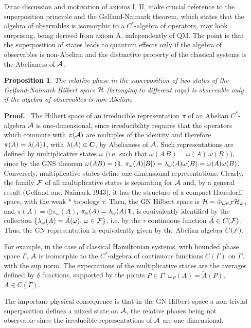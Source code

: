 \documentclass[12pt]{article}
\newtheorem{Proposition}[Theorem]{Proposition}
\def \Pf {{\bf Proof.\,\,}}
\def \l {{\lambda}}
\def \om {{\omega}}
\def \A {{\cal A}}
\def \F {{\cal F}}
\def \H {\mbox{${\cal H}$}}
\def \id {{\bf 1 }}
\def \Cbf {{\bf C}}
\begin{document}
\vspace{1mm} Dirac discussion and motivation of axioms I, II, make  crucial reference to the superposition principle and the Gelfand-Naimark theorem, which states that the algebra of observables is isomorphic to a $C^*$-algebra of operators,   may look surprising, being derived from axiom A, independently of QM.
The point is that the  superposition of states leads to quantum effects only if the algebra of observables is non-Abelian and the distinctive property of the classical systems  is the Abelianess of $\A$. 
\begin{Proposition}The relative phase in the superposition of two states of the Gelfand-Naimark  Hilbert space $\H$ (belonging to different rays) is observable only if the algebra of observables is non-Abelian.
\end{Proposition}
\Pf \, The Hilbert space of an  irreducible representation  $\pi$ of an Abelian $C^*$-algebra $\A$ is one-dimensional, since irreducibility requires that the operators which commute with $\pi(\A)$ are multiples of the identity and therefore  $\pi(A) = \l(A) \id $, with $\l(A) \in \Cbf$, by Abelianess of $\A$.  
Such representations are defined  by multiplicative  states $\omega$ (i.e. such that $\om(A\,B)= \om(A)\, \om(B)$), since by the GNS theorem  $\om(AB) = (\id,\,\pi_\omega(A) [B]) = \l_\omega(A) \omega(B) = \omega(A) \omega(B)$. Conversely, multiplicative states define one-dimensional representations.
Clearly, the family $\F$ of all multiplicative states is separating for $\A$ and, by  
a general result (Gelfand and Naimark 1943), it has the structure of a compact Hausdorff space, with the weak * topology $\tau$. Then, the GN Hilbert space  is $\H  = \oplus_{\omega \in \F} \H_\omega$, and $\pi(A) =\oplus \pi_\omega(A)$, $\pi_\omega(A) = \lambda_\omega(A)\, \id$, is equivalently identified by the collection $\{ \lambda_\om(A) = \tilde{A}(\omega), \,\omega \in \F \}$, i.e. by the $\tau$ continuous function $\tilde{A} \in C(\F)$. Thus, the GN representation is equivalently given by  the Abelian algebra  $C(\F)$. 
 
\noindent For example, in the case of classical Hamiltonian systems, with bounded phase space $\Gamma$, $\A$ is isomorphic to the $C^*$-algebra of continuous functions  $C(\Gamma)$ on $\Gamma$, with the sup norm.   
 The  expectations of the multiplicative states are the averages defined by $\delta$ functions, supported by the points $P \in \Gamma$: $\om_P(A) = \tilde{A}(P)$, $\tilde{A} \in C(\Gamma)$. 

\noindent The important physical consequence is that in the GN Hilbert space a non-trivial superposition defines a mixed state on $\A$, 
 the relative phases  being  not observable since the irreducible representations of $\A$ are one-dimensional.
\goodbreak
\end{document}
